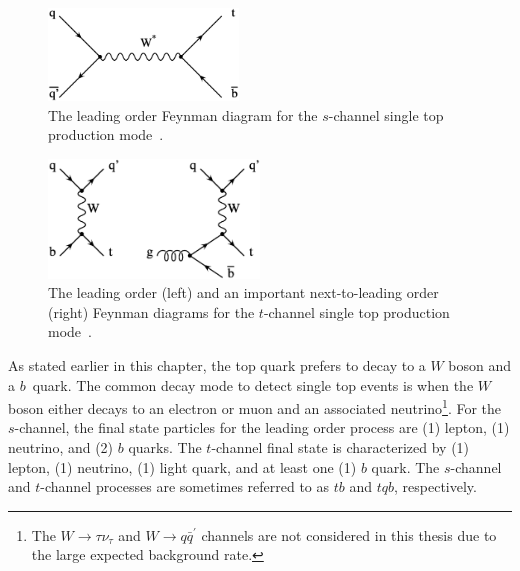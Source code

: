 \begin{figure}[!h!tbp]
\begin{center}
\includegraphics[width=0.45\textwidth]{eps/Theory/schannel.eps}
\end{center}
\vspace{-0.1in}
\caption{The leading order Feynman diagram for the $s$-channel single top production mode~\cite{Jabeen:2006km}.}
\label{schannel}
\end{figure}

\begin{figure}[!h!tbp]
\begin{center}
\includegraphics[width=0.50\textwidth]{eps/Theory/tchannel.eps}
\end{center}
\vspace{-0.1in}
\caption{The leading order (left) and an important next-to-leading order (right) Feynman diagrams for the $t$-channel single top production mode~\cite{Jabeen:2006km}.}
\label{tchannel}
\end{figure}

As stated earlier in this chapter, the top quark prefers to decay to a $W$ boson and a $b$~quark. The common decay mode to detect single top events is when the $W$ boson either decays to an electron or muon and an associated neutrino\footnote{The $W\rightarrow \tau \nu_{\tau}$ and $W\rightarrow q\bar{q}^{'}$ channels are not considered in this thesis due to the large expected background rate.}. For the $s$-channel, the final state particles for the leading order process are (1) lepton, (1) neutrino, and (2) $b$ quarks. The $t$-channel final state is characterized by (1) lepton, (1) neutrino, (1) light quark, and at least one (1) $b$ quark. The $s$-channel and $t$-channel processes are sometimes referred to as $tb$ and $tqb$, respectively.

